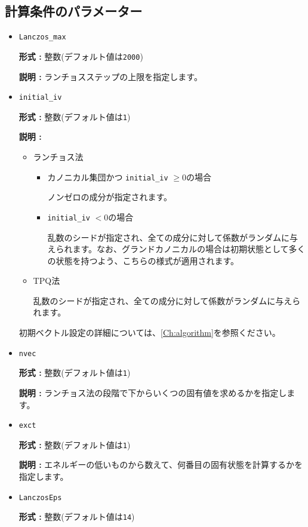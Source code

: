 \subsection{計算条件のパラメーター}
\begin{itemize}
\item \verb|Lanczos_max|

{\bf 形式 :} 整数(デフォルト値は\verb|2000|)

{\bf 説明 :} ランチョスステップの上限を指定します。

\item \verb|initial_iv|

{\bf 形式 :} 整数(デフォルト値は\verb|1|)

{\bf 説明 :}  
\begin{itemize}
\item{ランチョス法}
\begin{itemize}
\item{カノニカル集団かつ \verb|initial_iv| $\geq 0$の場合}

ノンゼロの成分が指定されます。

\item{ \verb|initial_iv| $< 0$の場合}

乱数のシードが指定され、全ての成分に対して係数がランダムに与えられます。なお、グランドカノニカルの場合は初期状態として多くの状態を持つよう、こちらの様式が適用されます。
\end{itemize}

\item{TPQ法}

乱数のシードが指定され、全ての成分に対して係数がランダムに与えられます。
\end{itemize}
初期ベクトル設定の詳細については、\ref{Ch:algorithm}を参照ください。

\item \verb|nvec|

{\bf 形式 :} 整数(デフォルト値は\verb|1|)

{\bf 説明 :} ランチョス法の段階で下からいくつの固有値を求めるかを指定します。

\item \verb|exct|

{\bf 形式 :} 整数(デフォルト値は\verb|1|)

{\bf 説明 :} エネルギーの低いものから数えて、何番目の固有状態を計算するかを指定します。

\item \verb|LanczosEps|

{\bf 形式 :} 整数(デフォルト値は\verb|14|)


\end{itemize}
